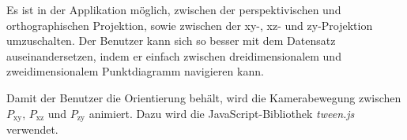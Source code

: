 Es ist in der Applikation möglich, zwischen der perspektivischen und orthographischen Projektion, sowie zwischen der xy-, xz- und zy-Projektion umzuschalten. Der Benutzer kann sich so besser mit dem Datensatz auseinandersetzen, indem er einfach zwischen dreidimensionalem und zweidimensionalem Punktdiagramm navigieren kann.

Damit der Benutzer die Orientierung behält, wird die Kamerabewegung zwischen $P_{\text{xy}}$, $P_{\text{xz}}$ und $P_{\text{zy}}$ animiert. Dazu wird die JavaScript-Bibliothek \textit{tween.js} \cite{tween} verwendet.